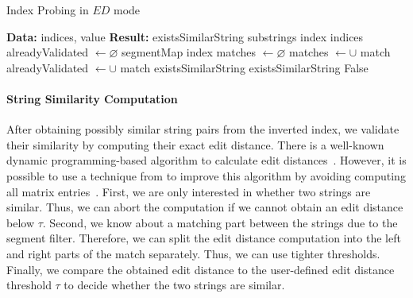 \begin{algorithm}
\caption{Index Probing in $ED$ mode}
\label{alg:deduplication}
\begin{algorithmic}[1]
\begin{itshape}
\Statex \textbf{Data:} indices, value
\Statex \textbf{Result:} existsSimilarString
        \State substrings \mgets{} 
        \State index \mgets{} indices
        \State alreadyValidated $\gets \varnothing$
            \State segmentMap \mgets{} index
            \State matches $\gets \varnothing$
                        \State matches $\gets \cup$ match
                        \State alreadyValidated $\gets \cup$ match
                    \EndIf
                \EndFor
            \EndFor
                \State existsSimilarString \mgets{} 
                    \State \Return existsSimilarString
                \EndIf
            \EndIf
        \EndFor
    \EndFor
    \State \Return False
\EndFunction
\end{itshape}
\end{algorithmic}
\end{algorithm}

\paragraph{String Similarity Computation}
\label{subsection:impl:edit_distance_dp}
After obtaining possibly similar string pairs from the inverted index, we validate their similarity by computing their exact edit distance.
There is a well-known dynamic programming-based algorithm to calculate edit distances~\cite{wagner1974string}.
However, it is possible to use a technique from \citeauthor{PassJoin} to improve this algorithm by avoiding computing all matrix entries~\cite{PassJoin}.
First, we are only interested in whether two strings are similar.
Thus, we can abort the computation if we cannot obtain an edit distance below $\tau$.
Second, we know about a matching part between the strings due to the segment filter.
Therefore, we can split the edit distance computation into the left and right parts of the match separately.
Thus, we can use tighter thresholds.
Finally, we compare the obtained edit distance to the user-defined edit distance threshold $\tau$ to decide whether the two strings are similar.

